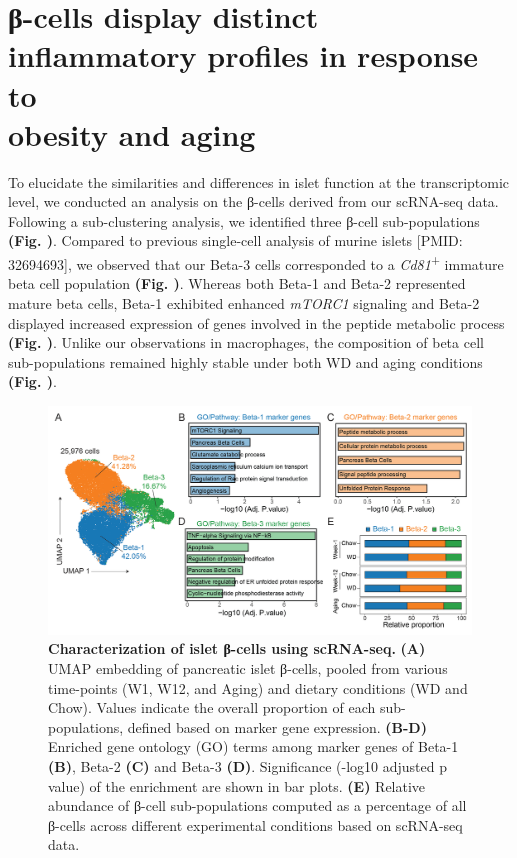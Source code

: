 \section{β-cells display distinct inflammatory profiles in response to\\obesity and aging}
\label{sec:chp2_betacells}

To elucidate the similarities and differences in islet function at the transcriptomic level, we conducted an analysis on the β-cells derived from our scRNA-seq data. Following a sub-clustering analysis, we identified three β-cell sub-populations \textbf{(Fig. )}. Compared to previous single-cell analysis of murine islets [PMID: 32694693], we observed that our Beta-3 cells corresponded to a \textit{Cd81}\textsuperscript{+} immature beta cell population \textbf{(Fig. )}. Whereas both Beta-1 and Beta-2 represented mature beta cells, Beta-1 exhibited enhanced \textit{mTORC1} signaling and Beta-2 displayed increased expression of genes involved in the peptide metabolic process \textbf{(Fig. )}. Unlike our observations in macrophages, the composition of beta cell sub-populations remained highly stable under both WD and aging conditions \textbf{(Fig. )}.\\

\begin{figure}[H]
    \centering
    \includegraphics[width=\linewidth]{Chapter4/Fig/F2-12-02.png}
    \caption[Characterization of islet β-cells using scRNA-seq]{\textbf{Characterization of islet β-cells using scRNA-seq.} \textbf{(A)} UMAP embedding of pancreatic islet β-cells, pooled from various time-points (W1, W12, and Aging) and dietary conditions (WD and Chow). Values indicate the overall proportion of each sub-populations, defined based on marker gene expression. \textbf{(B-D)} Enriched gene ontology (GO) terms among marker genes of Beta-1 \textbf{(B)}, Beta-2 \textbf{(C)} and Beta-3 \textbf{(D)}. Significance (-log10 adjusted p value) of the enrichment are shown in bar plots. \textbf{(E)} Relative abundance of β-cell sub-populations computed as a percentage of all β-cells across different experimental conditions based on scRNA-seq data.}
    \label{fig2-13}
\end{figure}

